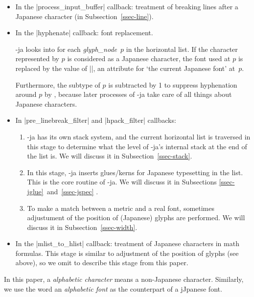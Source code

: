 \documentclass{ajt}
\begin{document}
\begin{itemize}
\item In the |process_input_buffer| callback: treatment of breaking
      lines after a Japanese character (in Subsection~\ref{ssec-line}).

\item In the |hyphenate| callback: font replacement.

\LuaTeX-ja looks into for each \textit{glyph\_node}~$p$ in the horizontal list. If
	   the character represented by $p$ is considered as a Japanese
	   character, the font used at $p$ is replaced by the value of
	   |\ltj@curjfnt|, an attribute for `the current Japanese font'
	   at~$p$.

Furthermore, the subtype of $p$ is subtracted by 1 to suppress
	   hyphenation around $p$ by \LuaTeX, because later processes of
	   \LuaTeX-ja take care of all things about Japanese characters.

\item In |pre_linebreak_filter| and |hpack_filter| callbacks:

\begin{enumerate}
\item \LuaTeX-ja has its own stack system, and the current horizontal
      list is traversed in this stage to determine what the level of
      \LuaTeX-ja's internal stack at the end of the list is. We will
      discuss it in Subsection~\ref{ssec-stack}.

\item In this stage, \LuaTeX-ja inserts glues/kerns for Japanese
      typesetting in the list. This is the core routine of \LuaTeX-ja.
      We will discuss it in Subsections
      \ref{ssec-jglue}~and~\ref{ssec-jspec} .

\item To make a match between a metric and a real font, sometimes
      adjustument of the position of (Japanese) glyphs are performed.
      We will discuss it in Subsection~\ref{ssec-width}.
\end{enumerate}
\item In the |mlist_to_hlist| callback: treatment of Japanese characters
      in math formulas. This stage is similar to adjustment of the
      position of glyphs (see above), so we omit to describe this stage
      from this paper.
\end{itemize}

In this paper, a \emph{alphabetic character} means a non-Japanese
character. Similarly, we use the word an \emph{alphabetic font} as the
counterpart of a jJpanese font.
\end{document}
